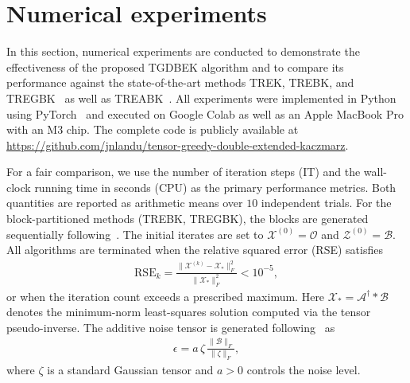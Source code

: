 \documentclass[11pt]{article}
\def\fm#1{\mathcal{#1}}
\begin{document}
\section{Numerical experiments} \label{sec:numexp}
In this section, numerical experiments are conducted to demonstrate the effectiveness of the proposed TGDBEK algorithm and to compare its performance against the state-of-the-art methods TREK, TREBK, and TREGBK~\cite{huang2023TREK} as well as TREABK~\cite{su2025}. All experiments were implemented in Python using PyTorch~\cite{ansel2025pytorch} and executed on Google Colab as well as an Apple MacBook Pro with an M3 chip. The complete code is publicly available at \url{https://github.com/jnlandu/tensor-greedy-double-extended-kaczmarz}.

For a fair comparison, we use the number of iteration steps (IT) and the wall-clock running time in seconds (CPU) as the primary performance metrics. Both quantities are reported as arithmetic means over $10$ independent trials. For the block-partitioned methods (TREBK, TREGBK), the blocks are generated sequentially following~\cite{du2020rando}. The initial iterates are set to $\fm X^{(0)} = \fm O$ and $\fm Z^{(0)} = \fm B$. All algorithms are terminated when the relative squared error (RSE) satisfies
\begin{align*}
    \mathrm{RSE}_k = \frac{\bigl\|\fm X^{(k)} - \fm X_\ast\bigr\|_F^2}{\|\fm X_\ast\|_F^2} < 10^{-5},
\end{align*}
or when the iteration count exceeds a prescribed maximum. Here $\fm X_\ast = \fm A^\dagger * \fm B$ denotes the minimum-norm least-squares solution computed via the tensor pseudo-inverse. The additive noise tensor is generated following~\cite{huang2023TREK} as
\begin{align}
    \fm\epsilon = a\,\fm\zeta\,\frac{\|\fm B\|_F}{\|\fm\zeta\|_F}, \label{eq:noise}
\end{align}
where $\fm\zeta$ is a standard Gaussian tensor and $a > 0$ controls the noise level.
\end{document}
